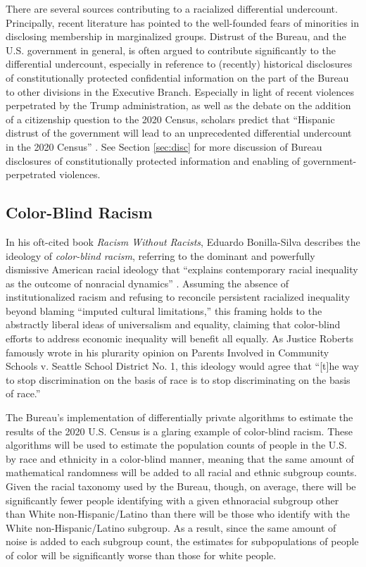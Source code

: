 There are several sources contributing to a racialized differential undercount. Principally, recent literature has pointed to the well-founded fears of minorities in disclosing membership in marginalized groups. Distrust of the Bureau, and the U.S. government in general, is often argued to contribute significantly to the differential undercount, especially in reference to (recently) historical disclosures of constitutionally protected confidential information on the part of the Bureau to other divisions in the Executive Branch. Especially in light of recent violences perpetrated by the Trump administration, as well as the debate on the addition of a citizenship question to the 2020 Census, scholars predict that ``Hispanic distrust of the government will lead to an unprecedented differential undercount in the 2020 Census'' \cite{fox_differential_2018}. See Section \ref{sec:disc} for more discussion of Bureau disclosures of constitutionally protected information and enabling of government-perpetrated violences.

\subsection{Color-Blind Racism}\label{sec:color-blind}

In his oft-cited book \textit{Racism Without Racists}, Eduardo Bonilla-Silva describes the ideology of \textit{color-blind racism}, referring to the dominant and powerfully dismissive American racial ideology that ``explains contemporary racial inequality as the outcome of nonracial dynamics'' \cite{bonilla-silva_racism_2010}. Assuming the absence of institutionalized racism and refusing to reconcile persistent racialized inequality beyond blaming ``imputed cultural limitations,'' this framing holds to the abstractly liberal ideas of universalism and equality, claiming that color-blind efforts to address economic inequality will benefit all equally. As Justice Roberts famously wrote in his plurarity opinion on Parents Involved in Community Schools v. Seattle School District No. 1, this ideology would agree that ``[t]he way to stop discrimination on the basis of race is to stop discriminating on the basis of race.'' 

The Bureau's implementation of differentially private algorithms to estimate the results of the 2020 U.S. Census is a glaring example of color-blind racism. These algorithms will be used to estimate the population counts of people in the U.S. by race and ethnicity in a color-blind manner, meaning that the same amount of mathematical randomness will be added to all racial and ethnic subgroup counts. Given the racial taxonomy used by the Bureau, though, on average, there will be significantly fewer people identifying with a given ethnoracial subgroup other than White non-Hispanic/Latino than there will be those who identify with the White non-Hispanic/Latino subgroup. As a result, since the same amount of noise is added to each subgroup count, the estimates for subpopulations of people of color will be significantly worse than those for white people.

